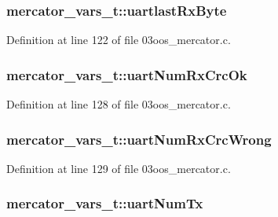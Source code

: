 \subsubsection[{\texorpdfstring{uartlast\+Rx\+Byte}{uartlastRxByte}}]{ mercator\+\_\+vars\+\_\+t\+::uartlast\+Rx\+Byte}\hypertarget{structmercator__vars__t_a2966f5934faa02c5a071eed6c6c75dfb}{}\label{structmercator__vars__t_a2966f5934faa02c5a071eed6c6c75dfb}


Definition at line 122 of file 03oos\+\_\+mercator.\+c.

\subsubsection[{\texorpdfstring{uart\+Num\+Rx\+Crc\+Ok}{uartNumRxCrcOk}}]{ mercator\+\_\+vars\+\_\+t\+::uart\+Num\+Rx\+Crc\+Ok}\hypertarget{structmercator__vars__t_abdf8ea8c72ecff0bf405b847a4d44c33}{}\label{structmercator__vars__t_abdf8ea8c72ecff0bf405b847a4d44c33}


Definition at line 128 of file 03oos\+\_\+mercator.\+c.

\subsubsection[{\texorpdfstring{uart\+Num\+Rx\+Crc\+Wrong}{uartNumRxCrcWrong}}]{ mercator\+\_\+vars\+\_\+t\+::uart\+Num\+Rx\+Crc\+Wrong}\hypertarget{structmercator__vars__t_a2ead3227328287a3f7d9001502445b1e}{}\label{structmercator__vars__t_a2ead3227328287a3f7d9001502445b1e}


Definition at line 129 of file 03oos\+\_\+mercator.\+c.

\subsubsection[{\texorpdfstring{uart\+Num\+Tx}{uartNumTx}}]{ mercator\+\_\+vars\+\_\+t\+::uart\+Num\+Tx}\hypertarget{structmercator__vars__t_a1c11a8192b0e7ed69692e62b50caaf18}{}\label{structmercator__vars__t_a1c11a8192b0e7ed69692e62b50caaf18}


